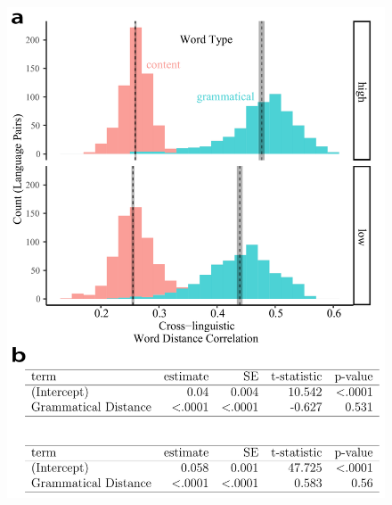 \documentclass[9pt,twoside,lineno]{pnas-new}
\begin{document}
\pagebreak
\clearpage


\begin{figure}[h]
\centering
     \includegraphics[width=4.5in]{suppfigs/syntax_control.pdf}


\end{figure}
\end{document}
